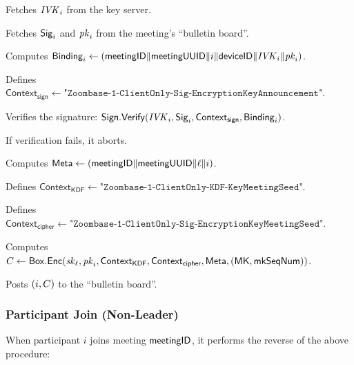 \begingroup
\RaggedRight
\begin{enumerate*}
\item Fetches $\mathit{IVK}_i$ from the key server.
\item Fetches ${\sf Sig}_i$ and $\mathit{pk}_i$ from the meeting's ``bulletin board''.
\item Computes ${\sf Binding}_i \leftarrow \left( {\sf meetingID} \| \allowbreak {\sf meetingUUID} \| i \allowbreak \| {\sf deviceID} \| \mathit{IVK}_i \| \allowbreak \mathit{pk}_i \right)$.
\item Defines $\textsf{Context}_\textsf{sign} \leftarrow \texttt{"Zoombase-1-ClientOnly-Sig-EncryptionKeyAnnouncement"}$.
\item Verifies the signature: ${\sf Sign}.\mathsf{Verify}(\mathit{IVK}_i, {\sf Sig}_i, \textsf{Context}_\textsf{sign}, {\sf Binding}_i)$.
\item If verification fails, it aborts.
\item Computes ${\sf Meta} \leftarrow \left( {\sf meetingID} \| \allowbreak {\sf meetingUUID} \| \allowbreak \ell \| i \right)$.
\item Defines $\textsf{Context}_\textsf{KDF} \leftarrow \texttt{"Zoombase-1-ClientOnly-KDF-KeyMeetingSeed"}$.
\item Defines $\textsf{Context}_\textsf{cipher} \leftarrow \texttt{"Zoombase-1-ClientOnly-Sig-EncryptionKeyMeetingSeed"}$.
\item Computes $C \leftarrow {\sf Box}.\mathsf{Enc}(\mathit{sk}_\ell, \mathit{pk}_i, \textsf{Context}_\textsf{KDF},
    \textsf{Context}_\textsf{cipher}, {\sf Meta}, ({\sf MK}, \mathsf{mkSeqNum}))$.
   \label{participantJoinRekeyStart}
\item Posts $(i, C)$ to the ``bulletin board''.
   \label{participantJoinRekeyEnd}
\end{enumerate*}
\endgroup

\subsubsection{Participant Join (Non-Leader)}

When participant $i$ joins meeting ${\sf meetingID}$, it performs the reverse of the above procedure:

